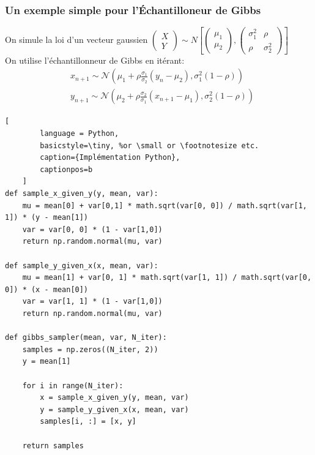 \begin{frame}
    \frametitle{Un exemple simple pour l'\'Echantilloneur de Gibbs  }
    On simule la loi d'un vecteur gaussien 
    $
    \left(\begin{array}{l}
    {X} \\
    {Y}
    \end{array}\right) \sim N\left[\left(\begin{array}{l}
    {\mu_{1}} \\
    {\mu_{2}}
    \end{array}\right),\left(\begin{array}{ll}
    {\sigma_1^2} & {\rho} \\
    {\rho} & {\sigma_2^2}
    \end{array}\right)\right]
    $ \\
On utilise l'échantillonneur de Gibbs en itérant:
$$
\begin{aligned}
&x_{n+1} \sim \mathcal{N}\left(\mu_{1}+\rho \frac{\sigma_{1}}{\sigma_{2}}\left(y_{n}-\mu_{2}\right), \sigma_{1}^{2}(1-\rho)\right)\\
&y_{n+1} \sim \mathcal{N}\left(\mu_{2}+\rho \frac{\sigma_{2}}{\sigma_{1}}\left(x_{n+1}-\mu_{1}\right), \sigma_{2}^{2}(1-\rho)\right)
\end{aligned}
$$ 
\end{frame}

\begin{frame}[fragile]
    \begin{lstlisting}[
        language = Python,
        basicstyle=\tiny, %or \small or \footnotesize etc.
        caption={Implémentation Python},
        captionpos=b
    ]
def sample_x_given_y(y, mean, var):
    mu = mean[0] + var[0,1] * math.sqrt(var[0, 0]) / math.sqrt(var[1, 1]) * (y - mean[1])
    var = var[0, 0] * (1 - var[1,0])
    return np.random.normal(mu, var)

def sample_y_given_x(x, mean, var):
    mu = mean[1] + var[0, 1] * math.sqrt(var[1, 1]) / math.sqrt(var[0, 0]) * (x - mean[0])
    var = var[1, 1] * (1 - var[1,0])
    return np.random.normal(mu, var)

def gibbs_sampler(mean, var, N_iter):
    samples = np.zeros((N_iter, 2))
    y = mean[1]

    for i in range(N_iter):
        x = sample_x_given_y(y, mean, var)
        y = sample_y_given_x(x, mean, var)
        samples[i, :] = [x, y]

    return samples
\end{lstlisting}
\end{frame}

